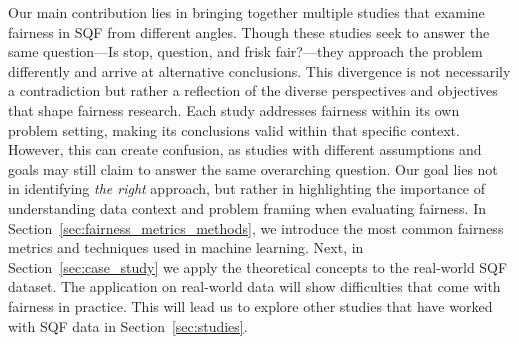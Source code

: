Our main contribution lies in bringing together multiple studies that examine fairness in SQF from different angles. Though these studies seek to answer the same question—Is stop, question, and frisk fair?—they approach the problem differently and arrive at alternative conclusions.
This divergence is not necessarily a contradiction but rather a reflection of the diverse perspectives and objectives that shape fairness research. Each study addresses fairness within its own problem setting, making its conclusions valid within that specific context. However, this can create confusion, as studies with different assumptions and goals may still claim to answer the same overarching question. Our goal lies not in identifying \textit{the right} approach, but rather in highlighting the importance of understanding data context and problem framing when evaluating fairness.
In Section~\ref{sec:fairness_metrics_methods}, we introduce the most common fairness metrics and techniques used in machine learning.
Next, in Section~\ref{sec:case_study} we apply the theoretical concepts to the real-world SQF dataset. 
The application on real-world data will show difficulties that come with fairness in practice.
This will lead us to explore other studies that have worked with SQF data in Section~\ref{sec:studies}. 


